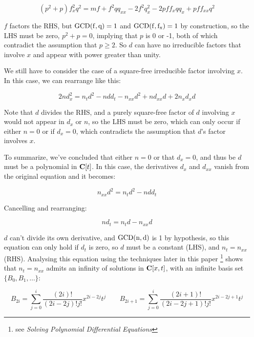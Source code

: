\documentclass{article}
\newcommand{\C}{\ensuremath{{\bf C}}}
\newcommand{\GCD}{\ensuremath{\rm{GCD}}}
\begin{document}
$$(p^{2} +p)f_x^{2}q^{2} = m f+f^{2}qq_{xx} -2f^{2}q_x^{2} -2pff_xqq_x +pff_{xx}q^{2}$$

$f$ factors the RHS, but $\GCD(f,q)=1$ and $\GCD(f,f_x)=1$ by
construction, so the LHS must be zero, $p^2 + p = 0$, implying that
$p$ is 0 or -1, both of which contradict the assumption that $p \ge
2$.  So $d$ can have no irreducible factors that involve $x$ and
appear with power greater than unity.

\begin{comment}
The leading term in $2nd_x^2 - n d_{xx} d$ is of power $x^{2r-2}$ and
has coefficient $2r^2 d_r - r(r-1)d_r^2$, so $r^2 + r =0$, and $r$
must be either $0$ or $-1$.  Obviously it can't be $-1$, what about
$0$?  Then $d$ would be a polynomial in $t$ that didn't involve $x$.
\end{comment}

We still have to consider the case of a square-free irreducible factor
involving $x$.  In this case, we can rearrange like this:

$$2nd_x^2 = n_t d^2 - n d d_t - n_{xx} d^2 + n d_{xx} d + 2 n_{x}d_{x}d$$

Note that $d$ divides the RHS, and a purely square-free factor of $d$
involving $x$ would not appear in $d_x$ or $n$, so the LHS must be
zero, which can only occur if either $n=0$ or if $d_x=0$, which
contradicts the assumption that $d$'s factor involves $x$.

To summarize, we've concluded that either $n=0$ or that $d_x=0$,
and thus be $d$ must be a polynomial in $\C[t]$.  In this case, the
derivatives $d_x$ and $d_{xx}$ vanish from the original equation and it becomes:

$$n_{xx} d^2 = n_t d^2 - n d d_t$$

Cancelling and rearranging:

$$n d_t = n_t d - n_{xx} d$$

$d$ can't divide its own derivative, and $\GCD(n,d)$ is 1 by
hypothesis, so this equation can only hold if $d_t$ is zero, so $d$
must be a constant (LHS), and $n_t = n_{xx}$ (RHS).  Analysing
this equation using the techniques later in this paper
\footnote{see {\it Solving Polynomial Differential Equations}}
shows that $n_t = n_{xx}$ admits an infinity of solutions
in $\C[x,t]$, with an infinite basis set $\{B_0, B_1, \ldots\}$:

$$B_{2i} = \sum_{j=0}^i \frac{(2i)!}{(2i-2j)!j!} x^{2i-2j} t^{j}
\qquad B_{2i+1} = \sum_{j=0}^i \frac{(2i+1)!}{(2i-2j+1)!j!} x^{2i-2j+1} t^{j}$$
\end{document}
